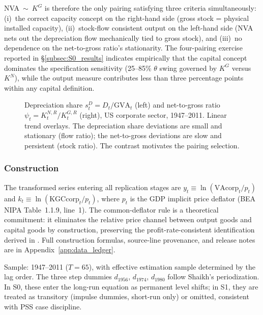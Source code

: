 \documentclass[11pt,a4paper]{article}
\begin{document}
NVA~$\sim$~$K^G$ is therefore the only pairing satisfying three criteria simultaneously: (i)~the correct capacity concept on the right-hand side (gross stock = physical installed capacity), (ii)~stock-flow consistent output on the left-hand side (NVA nets out the depreciation flow mechanically tied to gross stock), and (iii)~no dependence on the net-to-gross ratio's stationarity. The four-pairing exercise reported in \S\ref{subsec:S0_results} indicates empirically that the capital concept dominates the specification sensitivity (25--85\% $\theta$ swing governed by $K^G$ versus $K^N$), while the output measure contributes less than three percentage points within any capital definition.


\begin{figure}[!ht]
	\centering
	\caption{Depreciation share $s_t^D = D_t / \text{GVA}_t$ (left) and net-to-gross ratio $\psi_t = K_t^{N,R} / K_t^{G,R}$ (right), US corporate sector, 1947--2011. Linear trend overlays. The depreciation share deviations are small and stationary (flow ratio); the net-to-gross deviations are slow and persistent (stock ratio). The contrast motivates the pairing selection.}
	\label{fig:depreciation_psi}
\end{figure}


\subsubsection{Construction}

The transformed series entering all replication stages are $y_t \equiv \ln(\text{VAcorp}_t / p_t)$ and $k_t \equiv \ln(\text{KGCcorp}_t / p_t)$, where $p_t$ is the GDP implicit price deflator (BEA NIPA Table~1.1.9, line~1). The common-deflator rule is a theoretical commitment: it eliminates the relative price channel between output goods and capital goods by construction, preserving the profit-rate-consistent identification derived in \citet[Appendix~6.6]{Shaikh2016}. Full construction formulas, source-line provenance, and release notes are in Appendix~\ref{app:data_ledger}.

Sample: 1947--2011 ($T = 65$), with effective estimation sample determined by the lag order. The three step dummies $d_{1956}$, $d_{1974}$, $d_{1980}$ follow Shaikh's periodization. In S0, these enter the long-run equation as permanent level shifts; in S1, they are treated as transitory (impulse dummies, short-run only) or omitted, consistent with PSS case discipline.
\end{document}
